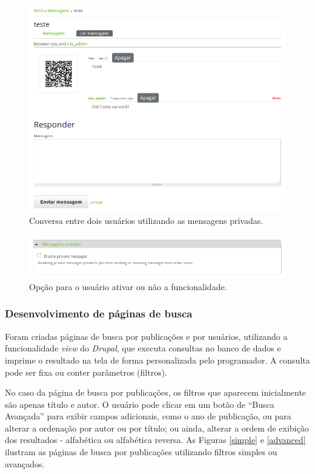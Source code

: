 \documentclass[a4paper]{article}
\begin{document}
\begin{figure}[pbth!]
\centering
\includegraphics[width=120mm]{img/privatemsg.png}
\caption{Conversa entre dois usuários utilizando as mensagens privadas.\label{privatemsg}}
\end{figure}

\begin{figure}[pbth!]
\centering
\includegraphics[width=120mm]{img/privatemsg-config.png}
\caption{Opção para o usuário ativar ou não a funcionalidade.\label{pvtmsg-config}}
\end{figure}


\subsubsection{Desenvolvimento de páginas de busca}

Foram criadas páginas de busca por publicações e por usuários, utilizando a funcionalidade \textit{view} do \textit{Drupal}, que executa consultas no banco de dados e imprime o resultado na tela de forma personalizada pelo programador. A consulta pode ser fixa ou conter parâmetros (filtros). 

No caso da página de busca por publicações, os filtros que aparecem inicialmente são apenas título e autor. O usuário pode clicar em um botão de “Busca Avançada” para exibir campos adicionais, como o ano de publicação, ou para alterar a ordenação por autor ou por título; ou ainda, alterar a ordem de exibição dos resultados - alfabética ou alfabética reversa. As Figuras \ref{simple} e \ref{advanced} ilustram as páginas de busca por publicações utilizando filtros simples ou avançados.
\end{document}
